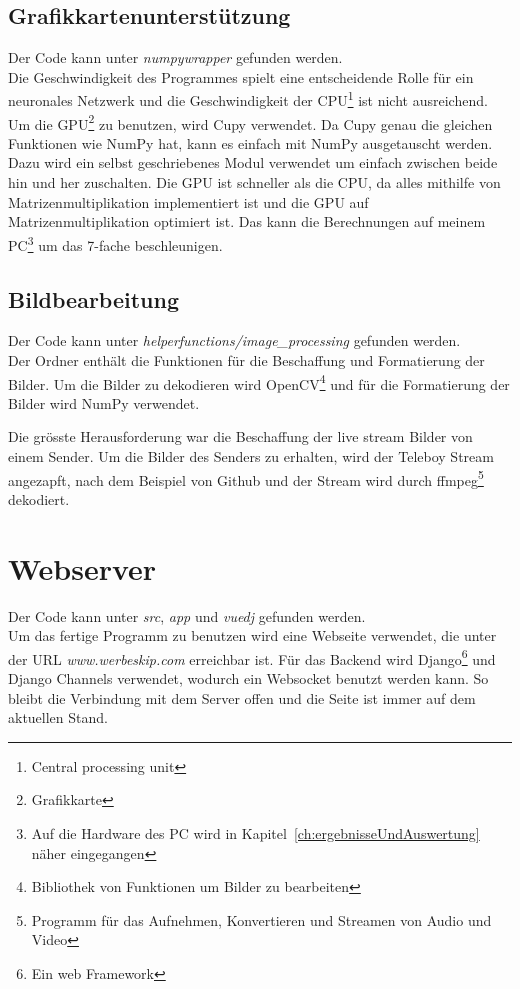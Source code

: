 \documentclass[12pt,a4paper]{report}
\begin{document}
\subsection{Grafikkartenunterstützung}
Der Code kann unter \textit{numpywrapper} gefunden werden.\bigskip\\
Die Geschwindigkeit des Programmes spielt eine entscheidende Rolle für ein
neuronales Netzwerk und die Geschwindigkeit der CPU\footnote{Central processing unit} ist nicht ausreichend.
Um die GPU\footnote{Grafikkarte} zu benutzen, wird Cupy verwendet.
Da Cupy genau die gleichen Funktionen wie NumPy hat, kann es einfach mit NumPy ausgetauscht werden.
Dazu wird ein selbst geschriebenes Modul verwendet um einfach zwischen beide hin und her zuschalten.
Die GPU ist schneller als die CPU, da alles mithilfe von Matrizenmultiplikation implementiert ist und
die GPU auf Matrizenmultiplikation optimiert ist.
Das kann die Berechnungen auf meinem
PC\footnote{Auf die Hardware des PC wird in Kapitel~\ref{ch:ergebnisseUndAuswertung} näher eingegangen} um das 7-fache beschleunigen.

\subsection{Bildbearbeitung}
Der Code kann unter \textit{helperfunctions/image\_processing} gefunden werden.\bigskip\\
Der Ordner enthält die Funktionen für die Beschaffung und Formatierung der Bilder.
Um die Bilder zu dekodieren wird OpenCV\cite{opencv_library}\footnote{Bibliothek von Funktionen um Bilder zu bearbeiten} und
für die Formatierung der Bilder wird NumPy verwendet.

Die grösste Herausforderung war die Beschaffung der live stream Bilder von einem Sender.
Um die Bilder des Senders zu erhalten, wird der Teleboy Stream angezapft, nach dem Beispiel von Github\cite{gittele} und
der Stream wird durch ffmpeg\footnote{Programm für das Aufnehmen, Konvertieren und Streamen von Audio und Video} dekodiert.

\section{Webserver}
Der Code kann unter \textit{src}, \textit{app} und \textit{vuedj} gefunden werden.\bigskip\\
Um das fertige Programm zu benutzen wird eine Webseite verwendet, die unter der URL \textit{www.werbeskip.com} erreichbar ist.
Für das Backend wird Django\cite{django}\footnote{Ein web Framework} und Django Channels\cite{django_channel} verwendet, wodurch ein Websocket benutzt werden kann.
So bleibt die Verbindung mit dem Server offen und die Seite ist immer auf dem aktuellen Stand.
\end{document}
